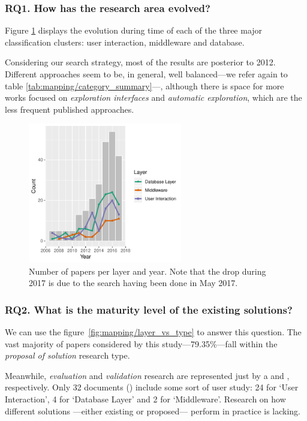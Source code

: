 \subsubsection{RQ1. How has the research area evolved?}
Figure \ref{fig:mapping/layers_histogram} displays the evolution during time
of each of the three major classification clusters: user interaction,
middleware and database.

Considering our search strategy, most of the
results are posterior to 2012. Different approaches seem to be, in general, well
balanced---we refer again to table \ref{tab:mapping/category_summary}---, although there
is space for more works focused on \emph{exploration interfaces} and
\emph{automatic exploration}, which are the less frequent published approaches.

\begin{figure}[hptb]
    \centering
    \includegraphics[width=0.6\textwidth]{images/3_mapping/layer_histogram}
    \caption[Number of studies per \gls{IDE} layer and year]{
        Number of papers per layer and year.
        Note that the drop during 2017 is due to the search having been done in May 2017.
    }
    \label{fig:mapping/layers_histogram}
\end{figure}

\subsubsection{RQ2. What is the maturity level of the existing solutions?}
We can use the figure~\ref{fig:mapping/layer_vs_type} to answer this question.
The vast majority of papers considered by this study---79.35\%---fall within the
\emph{proposal of solution} research type.

Meanwhile, \emph{evaluation} and \emph{validation} research are represented
just by a  and , respectively.
Only 32 documents () include some sort of user study:
24 for `User Interaction', 4 for `Database  Layer' and 2 for `Middleware'.
Research on how different solutions ---either existing or proposed--- perform in
practice is lacking.

